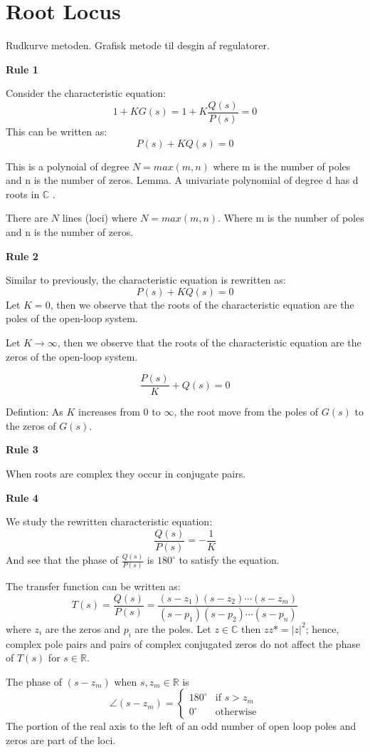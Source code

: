 \section{Root Locus}
Rudkurve metoden.
Grafisk metode til desgin af regulatorer.

\textbf{Rule 1}

Consider the characteristic equation:
$$ 1+KG(s) = 1 + K\frac{Q(s)}{P(s)} = 0$$
This can be written as:
$$P(s) + KQ(s) = 0$$

This is a polynoial of degree $N = max(m,n)$ where m is the number of poles and n is the number of zeros.
Lemma. A univariate polynomial of degree d has d roots in $\mathbb{C}$ .

There are $N$ lines (loci) where $N=max(m,n)$. Where m is the number of poles and n is the number of zeros.

\textbf{Rule 2}

Similar to previously, the characteristic equation is rewritten as:
$$P(s) + KQ(s) = 0$$
Let $K=0$, then we observe that the roots of the characteristic equation are the poles of
the open-loop system.

Let $K\to \infty$, then we observe that the roots of the characteristic equation are the zeros of
the open-loop system.

$$\frac{P(s)}{K} + Q(s) = 0$$

Defintion: As $K$ increases from 0 to $\infty$, the root move from the poles of $G(s)$
to the zeros of $G(s)$.

\textbf{Rule 3}

When roots are complex they occur in conjugate pairs.

\textbf{Rule 4}

We study the rewritten characteristic equation:
$$\frac{Q(s)}{P(s)} = -\frac{1}{K}$$
And see that the phase of $\frac{Q(s)}{P(s)}$ is $180^\circ$ to satisfy the equation.

The transfer function can be written as:
$$T(s) = \frac{Q(s)}{P(s)} = \frac{(s-z_1)(s-z_2)\cdots(s-z_m)}{(s-p_1)(s-p_2)\cdots(s-p_n)}$$
where $z_i$ are the zeros and $p_i$ are the poles.
Let $z \in \mathbb{C}$ then $zz* = |z|^2$; hence, complex pole pairs and pairs of complex
conjugated zeros do not affect the phase of $T(s)$ for $s \in \mathbb{R}$.

The phase of $(s-z_m)$ when $s,z_m \in \mathbb{R}$ is
\begin{equation}
	\angle(s-z_m) =
	\begin{cases}
		180^\circ & \text{if } s > z_m \\
		0^\circ   & \text{otherwise}
	\end{cases}
\end{equation}
The portion of the real axis to the left of an odd number of open loop poles and zeros
are part of the loci.

